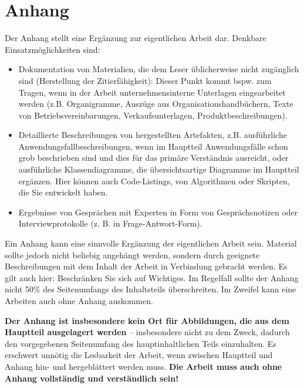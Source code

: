 \chapter{Anhang}
\label{chap:ein-anhang}

Der Anhang stellt eine Ergänzung zur eigentlichen Arbeit dar. Denkbare Einsatzmöglichkeiten sind:

\begin{itemize}
    \item Dokumentation von Materialien, die dem Leser üblicherweise nicht zugänglich sind (Herstellung der Zitierfähigkeit): Dieser Punkt kommt bspw. zum Tragen, wenn in der Arbeit unternehmensinterne Unterlagen eingearbeitet werden (z.B. Organigramme, Auszüge aus Organisationshandbüchern, Texte von Betriebsvereinbarungen, Verkaufsunterlagen, Produktbeschreibungen).
    \item Detaillierte Beschreibungen von hergestellten Artefakten, z.B. ausführliche Anwendungsfallbeschreibungen, wenn im Hauptteil Anwendungsfälle schon grob beschrieben sind und dies für das primäre Verständnis ausreicht, oder ausführliche Klassendiagramme, die übersichtsartige Diagramme im Hauptteil ergänzen. Hier können auch Code-Listings, von Algorithmen oder Skripten, die Sie entwickelt haben.
    \item Ergebnisse von Gesprächen mit Experten in Form von Gesprächsnotizen oder  Interviewprotokolle (z. B. in Frage-Antwort-Form).
\end{itemize}


Ein Anhang kann eine sinnvolle Ergänzung der eigentlichen Arbeit sein. Material sollte jedoch nicht beliebig angehängt werden, sondern durch geeignete Beschreibungen mit dem Inhalt der Arbeit in Verbindung gebracht werden. Es gilt auch hier: Beschränken Sie sich auf Wichtiges. Im Regelfall sollte der Anhang nicht 50\% des Seitenumfangs des Inhaltsteils überschreiten. Im Zweifel kann eine Arbeiten auch ohne Anhang auskommen.

\textbf{Der Anhang ist insbesondere kein Ort für Abbildungen, die aus dem Hauptteil ausgelagert werden} -- insbesondere nicht zu dem Zweck, dadurch den vorgegebenen Seitenumfang des hauptinhaltlichen Teils einzuhalten. Es erschwert unnötig die Lesbarkeit der Arbeit, wenn zwischen Hauptteil und Anhang hin- und hergeblättert werden muss. \textbf{Die Arbeit muss auch ohne Anhang vollständig und verständlich sein!}
